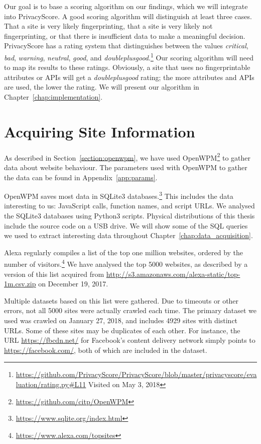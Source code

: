 \documentclass[
    fontsize=12pt,
    headings=small,
    parskip=half,
    bibliography=totoc,
    numbers=noenddot,
    open=any
    ]{scrreprt}
\begin{document}
Our goal is to base a scoring algorithm on our findings, which we will integrate into PrivacyScore.
A good scoring algorithm will distinguish at least three cases. That a site is very likely fingerprinting,
that a site is very likely not fingerprinting, or that there is insufficient data to make a meaningful decision.
PrivacyScore has a rating system that distinguishes between the values
\textit{critical}, \textit{bad}, \textit{warning}, \textit{neutral}, \textit{good},
and \textit{doubleplusgood}.\footnote{\url{https://github.com/PrivacyScore/PrivacyScore/blob/master/privacyscore/evaluation/rating.py\#L11} Visited on May 3, 2018}
Our scoring algorithm will need to map its results to these ratings. Obviously, a site that uses no fingerprintable
attributes or APIs will get a \textit{doubleplusgood} rating; the more attributes and APIs are used, the lower the rating.
We will present our algorithm in Chapter~\ref{chap:implementation}.

\section{Acquiring Site Information}
\label{sec:acquiring_information}
As described in Section~\ref{section:openwpm}, we have used OpenWPM\footnote{\url{https://github.com/citp/OpenWPM}} to gather data about
website behaviour.
The parameters used with OpenWPM to gather the data can be found in Appendix~\ref{app:params}.

OpenWPM saves most data in SQLite3 databases.\footnote{\url{https://www.sqlite.org/index.html}}
This includes the data interesting to us: JavaScript calls, function names, and script URLs.
We analysed the SQLite3 databases using Python3 scripts.
Physical distributions of this thesis include the source code on a USB drive.
We will show some of the SQL queries we used to extract interesting data throughout Chapter~\ref{chap:data_acquisition}.

Alexa regularly compiles a list of the top one million websites, ordered by the number of
visitors.\footnote{\url{https://www.alexa.com/topsites}}
We have analysed the top 5000 websites, as described by a version of this list acquired from
\url{http://s3.amazonaws.com/alexa-static/top-1m.csv.zip} on December 19, 2017.

Multiple datasets based on this list were gathered. Due to timeouts or other
errors, not all 5000 sites were actually crawled each time.
The primary dataset we used was crawled on January 27, 2018, and includes 4929 sites with distinct URLs. Some of these sites
may be duplicates of each other. For instance, the URL \url{https://fbcdn.net/} for Facebook's content delivery
network simply points to \url{https://facebook.com/}, both of which are included in the dataset.
\end{document}
